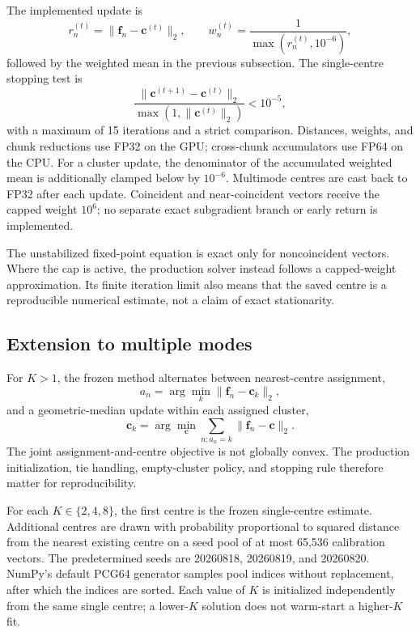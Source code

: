 The implemented update is
\begin{equation}
    r_n^{(t)}=\|\bm f_n-\bm c^{(t)}\|_2,
    \qquad
    w_n^{(t)}=\frac{1}{\max(r_n^{(t)},10^{-6})},
\end{equation}
followed by the weighted mean in the previous subsection. The single-centre
stopping test is
\begin{equation}
    \frac{\|\bm c^{(t+1)}-\bm c^{(t)}\|_2}
         {\max(1,\|\bm c^{(t)}\|_2)}<10^{-5},
\end{equation}
with a maximum of 15 iterations and a strict comparison. Distances, weights,
and chunk reductions use FP32 on the GPU; cross-chunk accumulators use FP64 on
the CPU. For a cluster update, the denominator of the accumulated weighted
mean is additionally clamped below by $10^{-6}$. Multimode centres are cast
back to FP32 after each update. Coincident and near-coincident vectors receive
the capped weight $10^6$; no separate exact subgradient branch or early return
is implemented.

The unstabilized fixed-point equation is exact only for noncoincident vectors.
Where the cap is active, the production solver instead follows a capped-weight
approximation. Its finite iteration limit also means that the saved centre is a
reproducible numerical estimate, not a claim of exact stationarity.

\subsection{Extension to multiple modes}

For $K>1$, the frozen method alternates between nearest-centre assignment,
\begin{equation}
    a_n=\arg\min_k\|\bm f_n-\bm c_k\|_2,
\end{equation}
and a geometric-median update within each assigned cluster,
\begin{equation}
    \bm c_k=\arg\min_{\bm c}
      \sum_{n:a_n=k}\|\bm f_n-\bm c\|_2.
\end{equation}
The joint assignment-and-centre objective is not globally convex. The
production initialization, tie handling, empty-cluster policy, and stopping
rule therefore matter for reproducibility.

For each $K\in\{2,4,8\}$, the first centre is the frozen single-centre estimate.
Additional centres are drawn with probability proportional to squared distance
from the nearest existing centre on a seed pool of at most 65,536 calibration
vectors. The predetermined seeds are 20260818, 20260819, and 20260820. NumPy's
default PCG64 generator samples pool indices without replacement, after which
the indices are sorted. Each value of $K$ is initialized independently from the
same single centre; a lower-$K$ solution does not warm-start a higher-$K$ fit.

